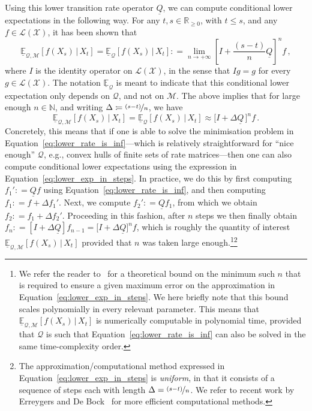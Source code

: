 \documentclass[3p]{elsarticle}
\newcommand{\nats}{\mathbb{N}}
\newcommand{\reals}{\mathbb{R}}
\newcommand{\realsnonneg}{\reals_{\geq 0}}
\newcommand{\states}{\mathcal{X}}
\newcommand{\lexp}{\underline{\mathbb{E}}_{\rateset,\mathcal{M}}}
\newcommand{\gambles}{\mathcal{L}}
\newcommand{\gamblesX}{\gambles(\states)}
\newcommand{\rateset}{\mathcal{Q}}
\newcommand{\lrate}{\underline{Q}}
\newcommand{\coloneqq}{:\!=}
\begin{document}
Using this lower transition rate operator $\lrate$, we can compute conditional lower expectations in the following way. For any $t,s\in\realsnonneg$, with $t\leq s$, and any $f\in\gamblesX$, it has been shown that
\begin{equation}\label{eq:conditional_only_rates}
\lexp[f(X_s)\,\vert\,X_t] = \underline{\mathbb{E}}_\rateset[f(X_s)\,\vert\,X_t] \coloneqq \lim_{n\to+\infty}\left[I+\frac{(s-t)}{n}\lrate\right]^n f\,,
\end{equation}
where $I$ is the identity operator on $\gamblesX$, in the sense that $I g=g$ for every $g\in\gamblesX$.
The notation $\underline{\mathbb{E}}_\rateset$ is meant to indicate that this conditional lower expectation only depends on $\rateset$, and not on $\mathcal{M}$. The above implies that for large enough $n\in\nats$, and writing $\Delta\coloneqq \nicefrac{(s-t)}{n}$, we have
\begin{equation}\label{eq:lower_exp_in_steps}
\lexp[f(X_s)\,\vert\,X_t] = \underline{\mathbb{E}}_\rateset[f(X_s)\,\vert\,X_t] \approx \bigl[I + \Delta\lrate\,\bigr]^nf\,.
\end{equation}
Concretely, this means that if one is able to solve the minimisation problem in Equation~\eqref{eq:lower_rate_is_inf}---which is relatively straightforward for ``nice enough'' $\rateset$, e.g., convex hulls of finite sets of rate matrices---then one can also compute conditional lower expectations using the expression in Equation~\ref{eq:lower_exp_in_steps}. In practice, we do this by first computing $f_1'\coloneqq \lrate f$ using Equation~\eqref{eq:lower_rate_is_inf}, and then computing $f_1\coloneqq f + \Delta f_1'$. Next, we compute $f_2'\coloneqq \lrate f_1$, from which we obtain $f_2\coloneqq f_1 + \Delta f_2'$. Proceeding in this fashion, after $n$ steps we then finally obtain $f_n \coloneqq [I+\Delta\lrate]f_{n-1} = \bigl[I+\Delta\lrate\bigr]^nf$, which is roughly the quantity of interest $\underline{\mathbb{E}}_{\rateset,\mathcal{M}}[f(X_s)\,\vert\,X_t]$ provided that $n$ was taken large enough.\footnote{We refer the reader to~\citep[Proposition 8.5]{krak2016ictmc} for a theoretical bound on the minimum such $n$ that is required to ensure a given maximum error on the approximation in Equation~\eqref{eq:lower_exp_in_steps}. We here briefly note that this bound scales polynomially in every relevant parameter. This means that $\lexp[f(X_s)\,\vert\,X_t]$ is numerically computable in polynomial time, provided that $\rateset$ is such that Equation~\eqref{eq:lower_rate_is_inf} can also be solved in the same time-complexity order.}\footnote{The approximation/computational method expressed in Equation~\eqref{eq:lower_exp_in_steps} is \emph{uniform}, in that it consists of a sequence of steps each with length $\Delta=\nicefrac{(s-t)}{n}$. We refer to recent work by Erreygers and De Bock~\cite{erreygers2017} for more efficient computational methods.}
\end{document}
